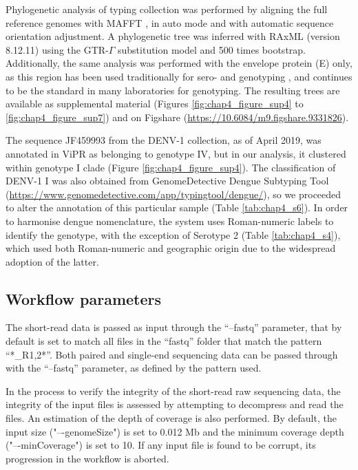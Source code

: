 Phylogenetic analysis of typing collection was performed by aligning the full reference genomes with MAFFT \citep{nakamura_parallelization_2018}, in auto mode and with automatic sequence orientation adjustment. A phylogenetic tree was inferred with RAxML (version 8.12.11) \citep{stamatakis_raxml_2014} using the GTR-$\Gamma$ substitution model and 500 times bootstrap. Additionally, the same analysis was performed with the envelope protein (E) only, as this region has been used traditionally for sero- and genotyping \citep{rico-hesse_molecular_1990, rico-hesse_microevolution_2003, lanciotti_rapid_1992, lanciotti_molecular_1997, klungthong_molecular_2004, zhang_clade_2005, zhang_structure_2006}, and continues to be the standard in many laboratories for genotyping. The resulting trees are available as supplemental material (Figures \ref{fig:chap4_figure_sup4} to \ref{fig:chap4_figure_sup7}) and on Figshare (\url{https://10.6084/m9.figshare.9331826}).

The sequence JF459993 from the DENV-1 collection, as of April 2019, was annotated in ViPR as belonging to genotype IV, but in our analysis, it clustered within genotype I clade (Figure \ref{fig:chap4_figure_sup4}). The classification of DENV-1 I was also obtained from GenomeDetective Dengue Subtyping Tool (\url{https://www.genomedetective.com/app/typingtool/dengue/}), so we proceeded to alter the annotation of this particular sample (Table \ref{tab:chap4_s6}). 
In order to harmonise dengue nomenclature, the system uses Roman-numeric labels to identify the genotype, with the exception of Serotype 2 (Table \ref{tab:chap4_s4}), which used both Roman-numeric and geographic origin due to the widespread adoption of the latter.

\subsection{Workflow parameters} \label{chap4_sup_workflow_params}

The short-read data is passed as input through the “--fastq” parameter, that by default is set to match all files in the “fastq” folder that match the pattern “*\_R{1,2}*”. Both paired and single-end sequencing data can be passed through with the “--fastq” parameter, as defined by the pattern used. 

In the process to verify the integrity of the short-read raw sequencing data, the integrity of the input files is assessed by attempting to decompress and read the files. An estimation of the depth of coverage is also performed. By default, the input size ("–-genomeSize") is set to 0.012 Mb and the minimum coverage depth ("–-minCoverage") is set to 10. If any input file is found to be corrupt, its progression in the workflow is aborted.


